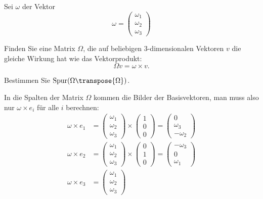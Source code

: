 Sei $\omega$ der Vektor
\[
\omega=\begin{pmatrix}\omega_1\\\omega_2\\\omega_3\end{pmatrix}
\]
\begin{teilaufgaben}
\item
Finden Sie eine Matrix $\Omega$, die auf beliebigen $3$-dimensionalen Vektoren $v$ die gleiche
Wirkung hat wie das Vektorprodukt:
\[
\Omega v=\omega\times v.
\]
\item Bestimmen Sie $\operatorname{Spur}(\Omega\transpose{\Omega})$.
\end{teilaufgaben}


\begin{loesung}
\begin{teilaufgaben}
\item In die Spalten der Matrix $\Omega$ kommen die Bilder der Basisvektoren,
man muss also nur $\omega\times e_i$ für alle $i$ berechnen:
\begin{align*}
\omega\times e_1
&=
\begin{pmatrix}\omega_1\\\omega_2\\\omega_3\end{pmatrix}
\times
\begin{pmatrix}1\\0\\0\end{pmatrix}
=
\begin{pmatrix}0\\\omega_3\\-\omega_2\end{pmatrix}
\\
\omega\times e_2
&=
\begin{pmatrix}\omega_1\\\omega_2\\\omega_3\end{pmatrix}
\times
\begin{pmatrix}0\\1\\0\end{pmatrix}
=
\begin{pmatrix}-\omega_3\\0\\\omega_1\end{pmatrix}
\\
\omega\times e_3
&=
\begin{pmatrix}\omega_1\\\omega_2\\\omega_3\end{pmatrix}

\end{align*}
\end{teilaufgaben}
\end{loesung}
